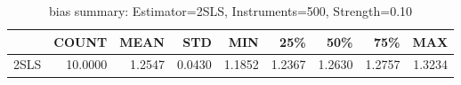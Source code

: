 \begin{table}[ht]
\centering
\caption{bias summary: Estimator=2SLS, Instruments=500, Strength=0.10}
\begin{tabular}{lrrrrrrrr}
\toprule
 & COUNT & MEAN & STD & MIN & 25\% & 50\% & 75\% & MAX \\
\midrule
2SLS & 10.0000 & 1.2547 & 0.0430 & 1.1852 & 1.2367 & 1.2630 & 1.2757 & 1.3234 \\
\bottomrule
\end{tabular}
\end{table}
